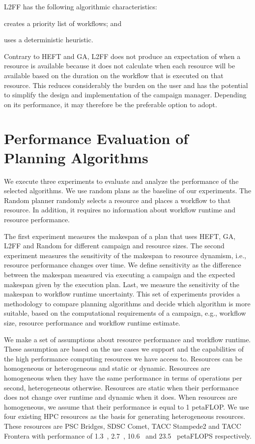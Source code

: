 L2FF has the following algorithmic characteristics:
\begin{inparaenum}[(1)]
    \item creates a priority list of workflows; and
    \item uses a deterministic heuristic.
\end{inparaenum}
Contrary to HEFT and GA, L2FF does not produce an expectation of when a resource
is available because it does not calculate when each resource will be available
based on the duration on the workflow that is executed on that resource. This
reduces considerably the burden on the user and has the potential to simplify
the design and implementation of the campaign manager. Depending on its
performance, it may therefore be the preferable option to adopt.

\section{Performance Evaluation of Planning Algorithms}
\label{sec:algo_perf_comp}

We execute three experiments to evaluate and analyze the performance of the
selected algorithms. We use random plans as the baseline of our experiments.
The Random planner randomly selects a resource and places a workflow to that
resource. In addition, it requires no information about workflow runtime and
resource performance.

The first experiment measures the makespan of a plan that uses HEFT, GA, L2FF
and Random for different campaign and resource sizes. The second experiment
measures the sensitivity of the makespan to resource dynamism, i.e., resource
performance changes over time. We define sensitivity as the difference between
the makespan measured via executing a campaign and the expected makespan given
by the execution plan. Last, we measure the sensitivity of the makespan to
workflow runtime uncertainty. This set of experiments provides a methodology to
compare planning algorithms and decide which algorithm is more suitable, based
on the computational requirements of a campaign, e.g., workflow size, resource
performance and workflow runtime estimate.

We make a set of assumptions about resource performance and workflow runtime.
These assumption are based on the use cases we support and the capabilities of
the high performance computing resources we have access to. Resources can be
homogeneous or heterogeneous and static or dynamic. Resources are homogeneous
when they have the same performance in terms of operations per second,
heterogeneous otherwise. Resources are static when their performance does not
change over runtime and dynamic when it does. When resources are homogeneous, we
assume that their performance is equal to 1 petaFLOP. We use four existing HPC
resources as the basis for generating heterogeneous resources. These resources
are PSC Bridges, SDSC Comet, TACC Stampede2 and TACC Frontera with 
performance of 1.3~\cite{bridges_perf}, 2.7~\cite{comet_perf}, 10.6~\cite{top500}
and 23.5~\cite{top500} petaFLOPS respectively.

